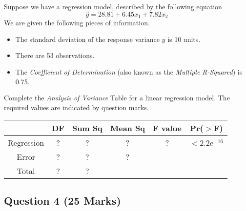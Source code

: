 \documentclass[a4paper,12pt]{article}
\begin{document}
Suppose we have a regression model, described by the following equation
\[ \hat{y} = 28.81 + 6.45x_1 + 7.82 x_2\]
We are given the following pieces of information.
\begin{itemize}
	\item The standard deviation of the response variance $y$ is 10 units.
	\item There are 53 observations.
	\item The \textit{Coefficient of Determination} (also known as the \textit{Multiple R-Squared}) is 0.75.
\end{itemize}
Complete the \textit{Analysis of Variance} Table for a linear regression model.
The required values are indicated by question marks.

\begin{center}
	\begin{tabular}{|c|c|c|c|c|c|} \hline
	\phantom{makespace}	& DF & 	Sum Sq &	Mean Sq &	F value &   	Pr($>$F)    \\ \hline
		Regression &  \phantom{make}?\phantom{make} &	? &	? &	 ? &	$< 2.2e^{-16}$ \\ \hline
		Error  & ? &	? &  	?   &            &       \\ \hline
		Total  & ?  &	? &  \phantom{makespace}	  &   \phantom{makespace}         &    \phantom{makespace}    \\ \hline
	\end{tabular} 
\end{center}


\newpage
\subsection*{Question 4 (25 Marks)}

%
%	
%
%
%
\end{document}
